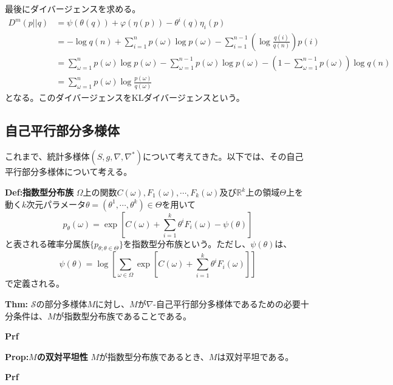 \documentclass[a4paper,11pt]{jsarticle}
\numberwithin{equation}{section}
\begin{document}
最後にダイバージェンスを求める。
\begin{align}
    D^m(p||q) &= \psi(\theta(q)) + \varphi(\eta(p)) - \theta^i(q) \eta_i(p)\\
    &= -\log q(n) + \sum_{i=1}^{n} p(\omega) \log p(\omega) - \sum_{i=1}^{n-1} \left(\log \frac{q(i)}{q(n)}\right) p(i)\\
    &= \sum_{\omega=1}^{n} p(\omega) \log p(\omega) - \sum_{\omega=1}^{n-1} p(\omega) \log p(\omega)-\left(1-\sum_{\omega=1}^{n-1} p(\omega)\right) \log q(n)\\
    &= \sum_{\omega=1}^{n} p(\omega) \log \frac{p(\omega)}{q(\omega)}
\end{align}
となる。このダイバージェンスをKLダイバージェンスという。\\


\subsection{自己平行部分多様体}
これまで、統計多様体$(S,g,\nabla,\nabla^*)$について考えてきた。以下では、その自己平行部分多様体について考える。\\
\begin{itembox}[l]{\textbf{Def:指数型分布族}}
    $\Omega$上の関数$C(\omega),F_1(\omega),\cdots,F_k(\omega)$及び$\mathbb{R}^k$上の領域$\Theta$上を動く$k$次元パラメータ$\theta = (\theta^1,\cdots,\theta^k) \in \Theta$を用いて
    \begin{equation}
        p_{\theta}(\omega) = \exp\left[ C(\omega) + \sum_{i=1}^{k} \theta^i F_i(\omega) - \psi(\theta) \right]
    \end{equation}
    と表される確率分属族$\{p_{\theta;\theta \in \Theta}\}$を指数型分布族という。ただし、$\psi(\theta)$は、
    \begin{equation}
        \psi(\theta) = \log \left[ \sum_{\omega \in \Omega} \exp\left[ C(\omega) + \sum_{i=1}^{k} \theta^i F_i(\omega) \right] \right]
    \end{equation}
    で定義される。  

\end{itembox}

\begin{itembox}[l]{\textbf{Thm:}}
    $\mathcal{S}$の部分多様体$M$に対し、$M$が$\nabla$-自己平行部分多様体であるための必要十分条件は、$M$が指数型分布族であることである。
\end{itembox}
\textbf{Prf}\\

\begin{itembox}[l]{\textbf{Prop:$M$の双対平坦性}}
    $M$が指数型分布族であるとき、$M$は双対平坦である。

\end{itembox}
\textbf{Prf}\\
\end{document}
